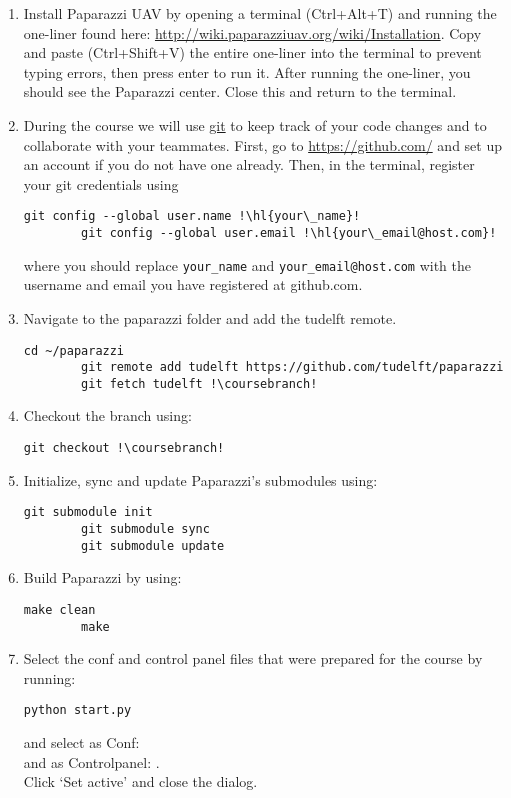 \begin{enumerate}
	\item{Install Paparazzi UAV by opening a terminal (Ctrl+Alt+T) and running the one-liner found here: \url{http://wiki.paparazziuav.org/wiki/Installation}. Copy and paste (Ctrl+Shift+V) the entire one-liner into the terminal to prevent typing errors, then press enter to run it. After running the one-liner, you should see the Paparazzi center. Close this and return to the terminal.}
	
	\item{During the course we will use \href{https://git-scm.com/}{git} to keep track of your code changes and to collaborate with your teammates. First, go to \url{https://github.com/} and set up an account if you do not have one already. Then, in the terminal, register your git credentials using
	\begin{lstlisting}[style=Bash]
		git config --global user.name !\hl{your\_name}!
		git config --global user.email !\hl{your\_email@host.com}!
	\end{lstlisting}
	where you should replace \texttt{your\_name} and \texttt{your\_email@host.com} with the username and email you have registered at github.com.}
	
	\item Navigate to the paparazzi folder and add the tudelft remote.
	\begin{lstlisting}[style=Bash]
		cd ~/paparazzi
		git remote add tudelft https://github.com/tudelft/paparazzi
		git fetch tudelft !\coursebranch!
	\end{lstlisting}
	
	\item Checkout the \coursebranch branch using:
	\begin{lstlisting}[style=Bash]
		git checkout !\coursebranch!
	\end{lstlisting}
	
	\item Initialize, sync and update Paparazzi's submodules using:
	\begin{lstlisting}[style=Bash]
		git submodule init
		git submodule sync
		git submodule update
	\end{lstlisting}
	
	\item Build Paparazzi by using:
	\begin{lstlisting}[style=Bash]
		make clean
		make
	\end{lstlisting}
	
	\item{Select the conf and control panel files that were prepared for the course by running:
	\begin{lstlisting}[style=Bash]
		python start.py
	\end{lstlisting}
	and select as Conf: \\
	and as Controlpanel: .\\
	Click `Set active' and close the dialog.}
	

\end{enumerate}

